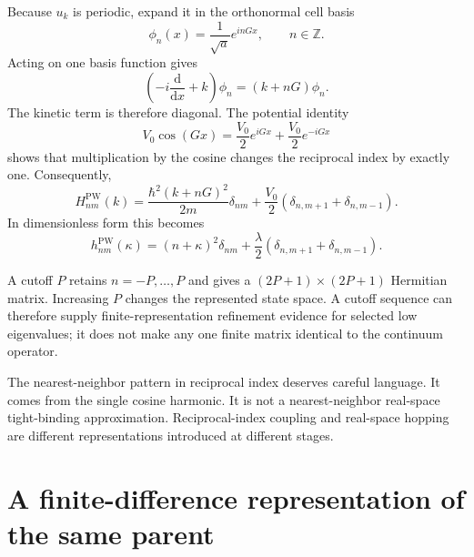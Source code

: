 Because $u_k$ is periodic, expand it in the orthonormal cell basis
\begin{equation}
  \phi_n(x)=\frac{1}{\sqrt a}e^{inGx},
  \qquad n\in\mathbb Z.
  \label{eq:training-isolated-plane-wave-basis}
\end{equation}
Acting on one basis function gives
\begin{equation}
  \left(-i\frac{\mathrm d}{\mathrm d x}+k\right)\phi_n
  =(k+nG)\phi_n.
\end{equation}
The kinetic term is therefore diagonal. The potential identity
\begin{equation}
  V_0\cos(Gx)
  =\frac{V_0}{2}e^{iGx}+\frac{V_0}{2}e^{-iGx}
\end{equation}
shows that multiplication by the cosine changes the reciprocal index by
exactly one. Consequently,
\begin{equation}
  H^{\mathrm{PW}}_{nm}(k)
  =\frac{\hbar^2(k+nG)^2}{2m}\delta_{nm}
   +\frac{V_0}{2}
    \left(\delta_{n,m+1}+\delta_{n,m-1}\right).
  \label{eq:training-isolated-plane-wave-matrix}
\end{equation}
In dimensionless form this becomes
\begin{equation}
  h^{\mathrm{PW}}_{nm}(\kappa)
  =(n+\kappa)^2\delta_{nm}
   +\frac{\lambda}{2}
    \left(\delta_{n,m+1}+\delta_{n,m-1}\right).
  \label{eq:training-isolated-dimensionless-plane-wave-matrix}
\end{equation}

A cutoff $P$ retains $n=-P,\ldots,P$ and gives a
$(2P+1)\times(2P+1)$ Hermitian matrix. Increasing $P$ changes the represented
state space. A cutoff sequence can therefore supply finite-representation
refinement evidence for selected low eigenvalues; it does not make any one
finite matrix identical to the continuum operator.

The nearest-neighbor pattern in reciprocal index deserves careful language. It
comes from the single cosine harmonic. It is not a nearest-neighbor
real-space tight-binding approximation. Reciprocal-index coupling and
real-space hopping are different representations introduced at different
stages.

\section{A finite-difference representation of the same parent}

